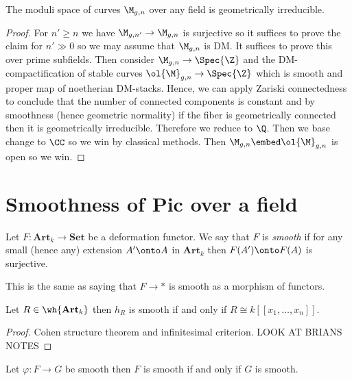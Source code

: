 \documentclass[12pt]{article}
\begin{document}
\begin{theorem}
The moduli space of curves $\M_{g,n}$ over any field is geometrically irreducible.
\end{theorem}

\begin{proof}
For $n' \ge n$ we have $\M_{g,n'} \to \M_{g,n}$ is surjective so it suffices to prove the claim for $n' \gg 0$ so we may assume that $\M_{g,n}$ is DM.
It suffices to prove this over prime subfields. Then consider $\M_{g,n} \to \Spec{\Z}$ and the DM-compactification of stable curves $\ol{\M}_{g,n} \to \Spec{\Z}$ which is smooth and proper map of noetherian DM-stacks. Hence, we can apply Zariski connectedness to conclude that the number of connected components is constant and by smoothness (hence geometric normality) if the fiber is geometrically connected then it is geometrically irreducible. Therefore we reduce to $\Q$. Then we base change to $\CC$ so we win by classical methods. Then $\M_{g,n} \embed \ol{\M}_{g,n}$ is open so we win.
\end{proof}

\section{Smoothness of Pic over a field}

\newcommand{\Art}{\mathbf{Art}}
\newcommand{\Set}{\mathbf{Set}}

\begin{defn}
Let $F : \Art_k \to \Set$ be a deformation functor. We say that $F$ is \textit{smooth} if for any small (hence any) extension $A' \onto A$ in $\Art_k$ then $F(A') \onto F(A)$ is surjective. 
\end{defn}

\begin{rmk}
This is the same as saying that $F \to *$ is smooth as a morphism of functors.
\end{rmk}

\begin{lemma}
Let $R \in \wh{\Art_k}$ then $h_R$ is smooth if and only if $R \cong k[[x_1, \dots, x_n]]$.
\end{lemma}

\begin{proof}
Cohen structure theorem and infinitesimal criterion. {\color{red} LOOK AT BRIANS NOTES}
\end{proof}

\begin{lemma}
Let $\varphi : F \to G$ be smooth then $F$ is smooth if and only if $G$ is smooth.
\end{lemma}
\end{document}
